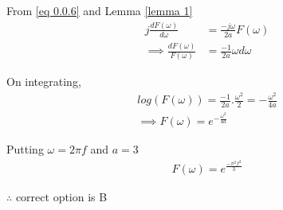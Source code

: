 \documentclass[journal,12pt,twocolumn]{IEEEtran}
\begin{document}
        From \eqref{eq 0.0.6} and Lemma \ref{lemma 1} 
        \begin{align}
            j\frac{dF(\omega)}{d\omega} &= \frac{-j\omega}{2a} F(\omega)\\
           \implies \frac{dF(\omega)}{F(\omega)} &= \frac{-1}{2a} \omega d\omega
        \end{align}
        
        On integrating,
        \begin{align}
            log(F(\omega)) = \frac{-1}{2a}.\frac{\omega^2}{2} = -\frac{\omega^2}{4a} \\
            \implies F(\omega) = e^{-\frac{\omega^2}{4a}} 
        \end{align}
        
        Putting $\omega = 2\pi f$ and $a = 3$
        \begin{align}
            F(\omega) = e^\frac{-\pi^2 f^2}{3}
        \end{align}
        
       $\therefore$ correct option is B
\end{document}
